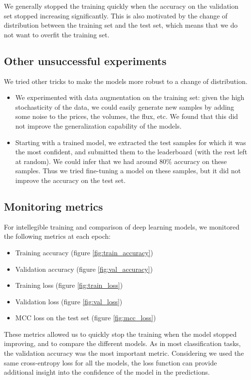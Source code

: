 \documentclass[switch, 11pt]{article}
\begin{document}
\begin{multicols}{2}
    We generally stopped the training quickly when the accuracy on the validation set stopped increasing significantly. This is also motivated by the change of distribution between the training set and the test set, which means that we do not want to overfit the training set.

    \subsection{Other unsuccessful experiments}

    We tried other tricks to make the models more robust to a change of distribution.
    \begin{itemize}
        \item We experimented with data augmentation on the training set: given the high stochasticity of the data, we could easily generate new samples by adding some noise to the prices, the volumes, the flux, etc. We found that this did not improve the generalization capability of the models.
        \item Starting with a trained model, we extracted the test samples for which it was the most confident, and submitted them to the leaderboard (with the rest left at random). We could infer that we had around $80\%$ accuracy on these samples. Thus we tried fine-tuning a model on these samples, but it did not improve the accuracy on the test set.
    \end{itemize}

    \subsection{Monitoring metrics}

    For intellegible training and comparison of deep learning models, we monitored the following metrics at each epoch:
    \begin{itemize}
        \item Training accuracy (figure \ref{fig:train_accuracy})
        \item Validation accuracy (figure \ref{fig:val_accuracy})
        \item Training loss (figure \ref{fig:train_loss})
        \item Validation loss (figure \ref{fig:val_loss})
        \item MCC loss on the test set (figure \ref{fig:mcc_loss})
    \end{itemize}

    These metrics allowed us to quickly stop the training when the model stopped improving, and to compare the different models. As in most classification tasks, the validation accuracy was the most important metric. Considering we used the same cross-entropy loss for all the models, the loss function can provide additional insight into the confidence of the model in the predictions.


\end{multicols}
\end{document}
